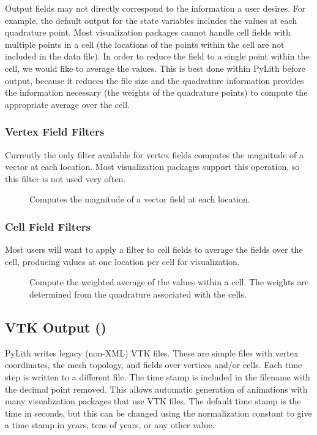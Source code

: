 Output fields may not directly correspond to the information a user
desires. For example, the default output for the state variables
includes the values at each quadrature point. Most visualization
packages cannot handle cell fields with multiple points in a cell (the
locations of the points within the cell are not included in the data
file). In order to reduce the field to a single point within the cell,
we would like to average the values. This is best done within PyLith
before output, because it reduces the file size and the quadrature
information provides the information necessary (the weights of the
quadrature points) to compute the appropriate average over the cell.

\subsubsection{Vertex Field Filters}
\label{sub:vertex:field:filters}

Currently the only filter available for vertex fields computes the
magnitude of a vector at each location. Most visualization packages
support this operation, so this filter is not used very often.
\begin{description}
\item [] Computes the magnitude of a vector field
at each location.
\end{description}

\subsubsection{Cell Field Filters}
\label{sub:cell:field:filters}

Most users will want to apply a filter to cell fields to average the
fields over the cell, producing values at one location per cell for
visualization.
\begin{description}
\item [] Compute the weighted average of the values within
a cell. The weights are determined from the quadrature associated
with the cells.
\end{description}

\subsection{VTK Output ()}

PyLith writes legacy (non-XML) VTK files. These are simple files with
vertex coordinates, the mesh topology, and fields over vertices and/or
cells. Each time step is written to a different file. The time stamp
is included in the filename with the decimal point removed. This allows
automatic generation of animations with many visualization packages
that use VTK files. The default time stamp is the time in seconds,
but this can be changed using the normalization constant to give a
time stamp in years, tens of years, or any other value.


